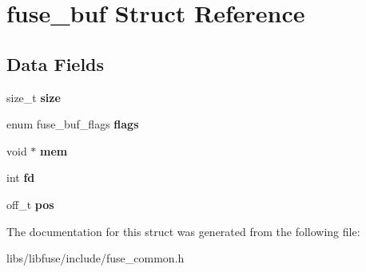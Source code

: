 \hypertarget{structfuse__buf}{}\section{fuse\+\_\+buf Struct Reference}
\label{structfuse__buf}
\subsection*{Data Fields}
\begin{DoxyCompactItemize}
\item 
size\+\_\+t {\bfseries size}\hypertarget{structfuse__buf_afb58c1e18f434d1d4edb784d00e2e13d}{}\label{structfuse__buf_afb58c1e18f434d1d4edb784d00e2e13d}

\item 
enum fuse\+\_\+buf\+\_\+flags {\bfseries flags}\hypertarget{structfuse__buf_a1928e204554f2d37cb8dac28a8a2f28c}{}\label{structfuse__buf_a1928e204554f2d37cb8dac28a8a2f28c}

\item 
void $\ast$ {\bfseries mem}\hypertarget{structfuse__buf_a537f80b7703cbfc860dfaf4b86de79ae}{}\label{structfuse__buf_a537f80b7703cbfc860dfaf4b86de79ae}

\item 
int {\bfseries fd}\hypertarget{structfuse__buf_a62b2ae82904ac4355142984b9dd90d68}{}\label{structfuse__buf_a62b2ae82904ac4355142984b9dd90d68}

\item 
off\+\_\+t {\bfseries pos}\hypertarget{structfuse__buf_a8de23b7869b06b9a9caef6beb7c9e88e}{}\label{structfuse__buf_a8de23b7869b06b9a9caef6beb7c9e88e}

\end{DoxyCompactItemize}


The documentation for this struct was generated from the following file\+:\begin{DoxyCompactItemize}
\item 
libs/libfuse/include/fuse\+\_\+common.\+h\end{DoxyCompactItemize}
